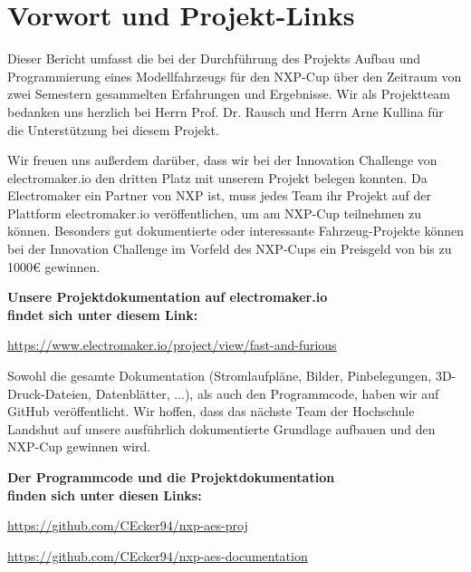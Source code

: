 

\pagestyle{fancy}
\rhead{\thepage} \chead{} 
\cfoot{}


\section*{Vorwort und Projekt-Links}\label{Sec0}

Dieser Bericht umfasst die bei der Durchführung des Projekts \glqq{}Aufbau und Programmierung eines Modellfahrzeugs für den  \ac{NXP}-Cup\grqq{} über den Zeitraum von zwei Semestern gesammelten Erfahrungen und Ergebnisse. Wir als Projektteam bedanken uns herzlich bei Herrn Prof. Dr. Rausch und Herrn Arne Kullina für die Unterstützung bei diesem Projekt.\vspace{11pt} 

Wir freuen uns außerdem darüber, dass wir bei der Innovation Challenge von electromaker.io den dritten Platz mit unserem Projekt belegen konnten. Da Electromaker ein Partner von NXP ist, muss jedes Team ihr Projekt auf der Plattform electromaker.io veröffentlichen, um am \ac{NXP}-Cup teilnehmen zu können. Besonders gut dokumentierte oder interessante Fahrzeug-Projekte können bei der Innovation Challenge im Vorfeld des \ac{NXP}-Cups ein Preisgeld von bis zu 1000€ gewinnen.\vspace{11pt}

\begin{center}
\textbf{Unsere Projektdokumentation auf electromaker.io}\\
\textbf{findet sich unter diesem Link:}\vspace{9pt} 

\url{https://www.electromaker.io/project/view/fast-and-furious}

\end{center}

Sowohl die gesamte Dokumentation (Stromlaufpläne, Bilder, Pinbelegungen, 3D-Druck-Dateien, Datenblätter, ...), als auch den Programmcode, haben wir auf GitHub veröffentlicht. Wir hoffen, dass das nächste Team der Hochschule Landshut auf unsere ausführlich dokumentierte Grundlage aufbauen und den NXP-Cup gewinnen wird.\vspace{11pt} 

\begin{center}
\textbf{Der Programmcode und die Projektdokumentation}\\
\textbf{finden sich unter diesen Links:}\vspace{9pt} 

\url{https://github.com/CEcker94/nxp-aes-proj}\vspace{5pt} 

\url{https://github.com/CEcker94/nxp-aes-documentation}

\end{center}


\newpage